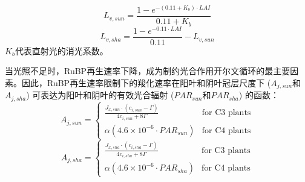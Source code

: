 \begin{equation}\label{L_vsun}
L_{v,sun}=\frac{1-e^{-\left(0.11+K_{b}\right) \cdot LAI}}{0.11+K_{b}}
\end{equation}
\begin{equation}\label{L_vsha}
L_{v,sha}=\frac{1-e^{-0.11\cdot LAI}}{0.11} - L_{v,sun}
\end{equation}
$K_{b}$代表直射光的消光系数。

当光照不足时，RuBP再生速率下降，成为制约光合作用开尔文循环的最主要因素。因此，RuBP再生速率限制下的羧化速率在阳叶和阴叶冠层尺度下 ($A_{j,sun}$和$A_{j,sha}$) 可表达为阳叶和阴叶的有效光合辐射 ($PAR_{sun}$和$PAR_{sha}$) 的函数：
\begin{equation}\label{A_J1sun}
A_{j,sun}=\begin{cases}\frac{J_{x,sun}\cdot\left(c_{i,sun}-\Gamma\right)}{4c_{i,sun}+8\Gamma}
     & \text{for C3 plants} \\
\alpha\left(4.6 \times 10^{-6} \cdot PAR_{sun}\right) & \text{for C4 plants}
\end{cases}
\end{equation}
\begin{equation}\label{A_J1sha}
A_{j,sha}=\begin{cases}\frac{J_{x,sha}\cdot\left(c_{i,sha}-\Gamma\right)}{4c_{i,sha}+8\Gamma}
     & \text{for C3 plants} \\
\alpha\left(4.6 \times 10^{-6} \cdot PAR_{sha}\right) & \text{for C4 plants}
\end{cases}
\end{equation}

